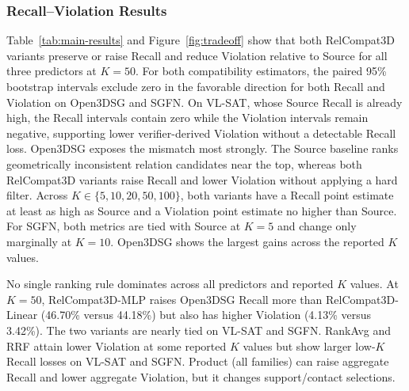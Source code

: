 \subsubsection{Recall–Violation Results}
Table~\ref{tab:main-results} and Figure~\ref{fig:tradeoff} show that both RelCompat3D variants preserve or raise Recall and reduce Violation relative to Source for all three predictors at $K=50$. For both compatibility estimators, the paired 95\% bootstrap intervals exclude zero in the favorable direction
for both Recall and Violation on Open3DSG and SGFN. On VL-SAT, whose Source Recall is already high, the Recall intervals contain zero while the Violation intervals remain negative, supporting lower verifier-derived Violation without a detectable Recall loss. Open3DSG exposes the mismatch most strongly. The Source baseline ranks geometrically inconsistent relation candidates near the top, whereas both RelCompat3D variants raise Recall and lower Violation without applying a hard filter. Across $K\in\{5,10,20,50,100\}$, both variants have a Recall point estimate at least as high as Source and a Violation point estimate no higher than Source. For SGFN, both metrics are tied with Source at $K=5$ and change only marginally at $K=10$. Open3DSG shows the largest gains across the reported $K$ values. 

No single ranking rule dominates across all predictors and reported $K$ values. At $K=50$, RelCompat3D-MLP raises Open3DSG Recall more than RelCompat3D-Linear (46.70\% versus 44.18\%) but also has higher Violation (4.13\% versus 3.42\%). The two variants are nearly tied on VL-SAT and SGFN. RankAvg and RRF attain lower Violation at some reported $K$ values but show larger low-$K$ Recall losses on VL-SAT and SGFN. Product (all families) can raise aggregate Recall and lower aggregate Violation, but it changes support/contact selections. 

